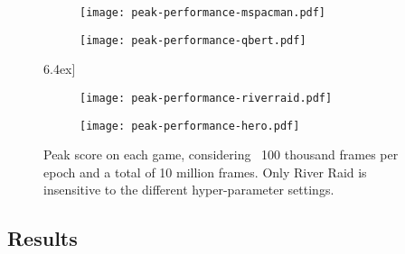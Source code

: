 \documentclass{article}
\begin{document}
\begin{figure}[htb]
    \centering
    \begin{subfigure}{.49\textwidth}
        \centering
        \texttt{[image: peak-performance-mspacman.pdf]}
        \label{fig:peak-mspacman}
    \end{subfigure}
    \begin{subfigure}{.49\textwidth}
        \centering
        \texttt{[image: peak-performance-qbert.pdf]}
        \label{fig:peak-qbert}
    \end{subfigure}\-6.4ex]
    \begin{subfigure}{.49\textwidth}
        \centering
        \texttt{[image: peak-performance-riverraid.pdf]}
        \label{fig:peak-riverraid}
    \end{subfigure}
    \begin{subfigure}{.49\textwidth}
        \centering
        \texttt{[image: peak-performance-hero.pdf]}
        \label{fig:peak-hero}
    \end{subfigure}\vspace{-1.5\baselineskip}
    
    \caption{Peak score on each game, considering ~100 thousand frames per epoch and a total of 10 million frames. Only River Raid is insensitive to the different hyper-parameter settings.}
    \label{fig:peak}
\end{figure}

\subsection{Results}
\end{document}
